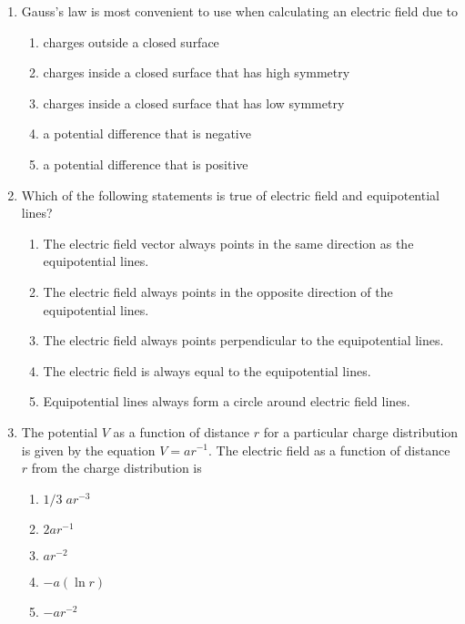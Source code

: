 \documentclass[12pt]{article}
\begin{document}
\begin{enumerate}[leftmargin=50pt,label=\underline{\hspace{0.4in}} \arabic*.]
\item Gauss's law is most convenient to use when calculating an electric field
  due to
  \begin{enumerate}[noitemsep,topsep=0pt,leftmargin=18pt,label=(\Alph*)]
  \item charges outside a closed surface
  \item charges inside a closed surface that has high symmetry
  \item charges inside a closed surface that has low symmetry
  \item a potential difference that is negative
  \item a potential difference that is positive
  \end{enumerate}
\newpage
\item Which of the following statements is true of electric field and
  equipotential lines?
  \begin{enumerate}[noitemsep,topsep=0pt,leftmargin=18pt,label=(\Alph*)]
  \item The electric field vector always points in the same direction as the
    equipotential lines.
  \item The electric field always points in the opposite direction of the
    equipotential lines.
  \item The electric field always points perpendicular to the equipotential
    lines.
  \item The electric field is always equal to the equipotential lines.
  \item Equipotential lines always form a circle around electric field lines.
  \end{enumerate}

\item The potential $V$ as a function of distance $r$ for a particular charge
  distribution is given by the equation $V=ar^{-1}$. The electric field as
  a function of distance $r$ from the charge distribution is
  \begin{enumerate}[noitemsep,topsep=0pt,leftmargin=18pt,label=(\Alph*)]
  \item $1/3\;ar^{-3}$
  \item $2ar^{-1}$
  \item $ar^{−2}$
  \item $−a(\ln r)$
  \item $−ar^{-2}$
  \end{enumerate}
  
  \vspace{-.35in}
  \begin{center}
  \end{center}


\end{enumerate}
\end{document}
